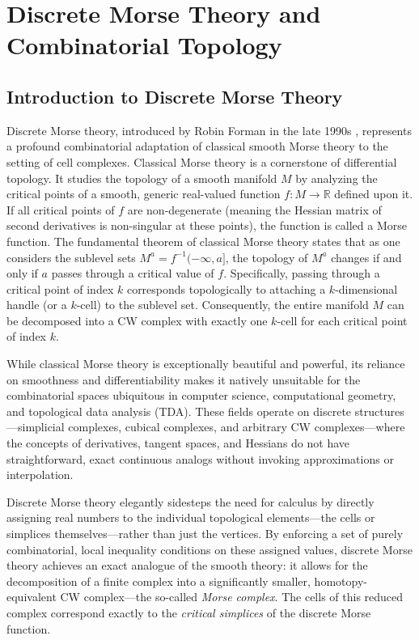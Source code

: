 \chapter{Discrete Morse Theory and Combinatorial Topology}
\label{ch:discrete_morse_theory}

\section{Introduction to Discrete Morse Theory}

Discrete Morse theory, introduced by Robin Forman in the late 1990s \cite{forman1998morse}, represents a profound combinatorial adaptation of classical smooth Morse theory to the setting of cell complexes. Classical Morse theory is a cornerstone of differential topology. It studies the topology of a smooth manifold $M$ by analyzing the critical points of a smooth, generic real-valued function $f: M \to \mathbb{R}$ defined upon it. If all critical points of $f$ are non-degenerate (meaning the Hessian matrix of second derivatives is non-singular at these points), the function is called a Morse function. The fundamental theorem of classical Morse theory states that as one considers the sublevel sets $M^a = f^{-1}(-\infty, a]$, the topology of $M^a$ changes if and only if $a$ passes through a critical value of $f$. Specifically, passing through a critical point of index $k$ corresponds topologically to attaching a $k$-dimensional handle (or a $k$-cell) to the sublevel set. Consequently, the entire manifold $M$ can be decomposed into a CW complex with exactly one $k$-cell for each critical point of index $k$.

While classical Morse theory is exceptionally beautiful and powerful, its reliance on smoothness and differentiability makes it natively unsuitable for the combinatorial spaces ubiquitous in computer science, computational geometry, and topological data analysis (TDA). These fields operate on discrete structures—simplicial complexes, cubical complexes, and arbitrary CW complexes—where the concepts of derivatives, tangent spaces, and Hessians do not have straightforward, exact continuous analogs without invoking approximations or interpolation.

Discrete Morse theory elegantly sidesteps the need for calculus by directly assigning real numbers to the individual topological elements—the cells or simplices themselves—rather than just the vertices. By enforcing a set of purely combinatorial, local inequality conditions on these assigned values, discrete Morse theory achieves an exact analogue of the smooth theory: it allows for the decomposition of a finite complex into a significantly smaller, homotopy-equivalent CW complex—the so-called \emph{Morse complex}. The cells of this reduced complex correspond exactly to the \emph{critical simplices} of the discrete Morse function. 

